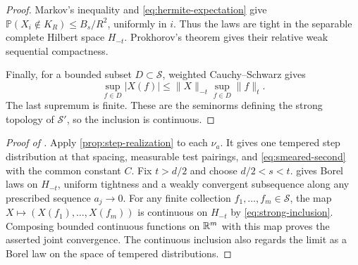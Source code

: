 \documentclass[11pt,letterpaper,reqno]{amsart}
\begin{document}
\begin{proof}
Markov's inequality and \eqref{eq:hermite-expectation} give
$\mathbb P(X_i\notin K_R)\le B_s/R^2$, uniformly in $i$.
Thus the laws are tight in the separable complete Hilbert space
$H_{-t}$. Prokhorov's theorem
\cite[Theorem~1.1]{Sorensen} gives their relative weak sequential
compactness.

Finally, for a bounded subset $D\subset\mathcal S$, weighted
Cauchy--Schwarz gives
\begin{equation}\label{eq:strong-inclusion}
 \sup_{f\in D}|X(f)|\le\|X\|_{-t}\sup_{f\in D}\|f\|_t.
\end{equation}
The last supremum is finite. These are the seminorms defining
the strong topology of $\mathcal S'$, so the inclusion is
continuous.
\end{proof}

\begin{proof}[Proof of ]
Apply \cref{prop:step-realization} to each $\nu_a$. It gives
one tempered step distribution at that spacing, measurable test
pairings, and \eqref{eq:smeared-second} with the common constant
$C$. Fix $t>d/2$ and choose $d/2<s<t$.
 gives Borel laws on $H_{-t}$,
uniform tightness and a weakly convergent subsequence along
any prescribed sequence $a_j\to0$. For any finite collection
$f_1,\ldots,f_m\in\mathcal S$, the map
$X\mapsto(X(f_1),\ldots,X(f_m))$ is continuous on $H_{-t}$
by \eqref{eq:strong-inclusion}. Composing bounded continuous
functions on $\mathbb R^m$ with this map proves the asserted joint
convergence. The continuous inclusion also regards the limit
as a Borel law on the space of tempered distributions.
\end{proof}





\printbibliography
\end{document}
